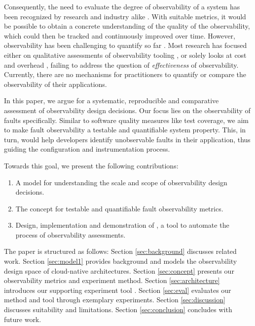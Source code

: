 Consequently, the need to evaluate the degree of observability of a system has been recognized by research and industry alike \cite{Tamburri_MVCObservability_2018,Google_MonitoringMeasurement_2023,Ahmed_EffectivenessOfAPM_2016,Vale_MicroserviceQualityMeasurementIndustrySurvey_2022}. With suitable metrics, it would be possible to obtain a concrete understanding of the quality of the observability, which could then be tracked and continuously improved over time. However, observability has been challenging to quantify so far \cite{Tamburri_MVCObservability_2018}. Most research has focused either on qualitative assessments of observability tooling \cite{Janes_TracingQualitativeAnalysis_2022}, or solely looks at cost and overhead  \cite{Ernst_OfflineTraceGeneration_2021,Reichelt_OverheadOpenTelemetryEtc,Dinga_EnergyEfficiencyOfMonitoring_2023}, failing to address the question of \textit{effectiveness} of observability. 
Currently, there are no mechanisms for practitioners to quantify or compare the observability of their applications.

In this paper, we argue for a systematic, reproducible and comparative assessment of observability design decisions. %
Our focus lies on the observability of faults specifically. Similar to software quality measures like test coverage, we aim to make fault observability a testable and quantifiable system property. This, in turn, would help developers identify unobservable faults in their application, thus guiding the configuration and instrumentation process. 

Towards this goal, we present the following contributions: \begin{enumerate}
    \item A model for understanding the scale and scope of observability design decisions.
    \item The concept for testable and quantifiable fault observability metrics.%
    \item Design, implementation and demonstration of \name{}, a tool to automate the process of observability assessments.
\end{enumerate}
The paper is structured as follows: Section \ref{sec:background}  discusses related work.  Section \ref{sec:model1}  provides background and models the observability design space of cloud-native architectures. Section \ref{sec:concept} presents our observability metrics and experiment method. Section \ref{sec:architecture} introduces our supporting experiment tool \name{}. Section \ref{sec:eval} evaluates our method and tool through exemplary experiments. Section \ref{sec:discussion} discusses suitability and limitations. Section \ref{sec:conclusion} concludes with future work.
